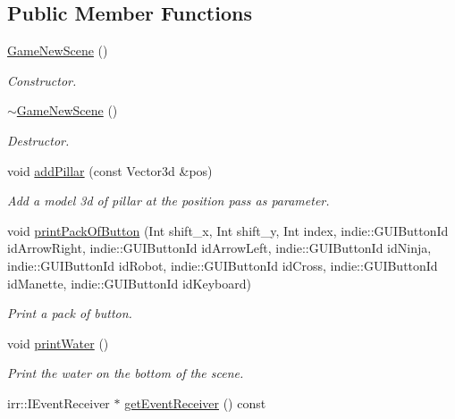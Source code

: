 \subsection*{Public Member Functions}
\begin{DoxyCompactItemize}
\item 
\hyperlink{classGameNewScene_af482b13a2d9e315ef39a6e41293bf4fb}{Game\+New\+Scene} ()
\begin{DoxyCompactList}\small\item\em Constructor. \end{DoxyCompactList}\item 
\hyperlink{classGameNewScene_a3df0ff81012d3f7dbd08c7367be22fdf}{$\sim$\+Game\+New\+Scene} ()
\begin{DoxyCompactList}\small\item\em Destructor. \end{DoxyCompactList}\item 
void \hyperlink{classGameNewScene_a59826abb850ba5d561a42865efb6a17a}{add\+Pillar} (const Vector3d \&pos)
\begin{DoxyCompactList}\small\item\em Add a model 3d of pillar at the position pass as parameter. \end{DoxyCompactList}\item 
void \hyperlink{classGameNewScene_a91e4754cf941c9ef80f539eab3f87ada}{print\+Pack\+Of\+Button} (Int shift\+\_\+x, Int shift\+\_\+y, Int index, indie\+::\+G\+U\+I\+Button\+Id id\+Arrow\+Right, indie\+::\+G\+U\+I\+Button\+Id id\+Arrow\+Left, indie\+::\+G\+U\+I\+Button\+Id id\+Ninja, indie\+::\+G\+U\+I\+Button\+Id id\+Robot, indie\+::\+G\+U\+I\+Button\+Id id\+Cross, indie\+::\+G\+U\+I\+Button\+Id id\+Manette, indie\+::\+G\+U\+I\+Button\+Id id\+Keyboard)
\begin{DoxyCompactList}\small\item\em Print a pack of button. \end{DoxyCompactList}\item 
\mbox{\label{classGameNewScene_a767d5e79b8a91b63ae3494e0df86ce22}} 
void \hyperlink{classGameNewScene_a767d5e79b8a91b63ae3494e0df86ce22}{print\+Water} ()
\begin{DoxyCompactList}\small\item\em Print the water on the bottom of the scene. \end{DoxyCompactList}\item 
irr\+::\+I\+Event\+Receiver $\ast$ \hyperlink{classGameNewScene_a21c27ef3ea1923d975683e1bcdd134fa}{get\+Event\+Receiver} () const

\end{DoxyCompactItemize}

